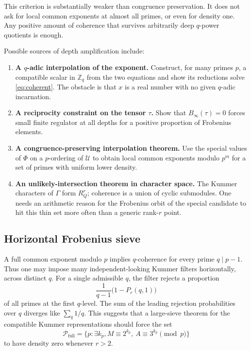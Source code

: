 \documentclass[11pt]{article}
\theoremstyle{definition}
\theoremstyle{remark}
\newcommand{\Z}{\mathbb{Z}}
\begin{document}
This criterion is substantially weaker than congruence preservation.  It does not ask for local
common exponents at almost all primes, or even for density one.  Any positive amount of coherence
that survives arbitrarily deep $q$-power quotients is enough.

Possible sources of depth amplification include:
\begin{enumerate}[leftmargin=2.2em]
\item \textbf{A $q$-adic interpolation of the exponent.}  Construct, for many primes $p$, a
      compatible scalar in $\Z_q$ from the two equations and show its reductions solve
      \eqref{eq:coherent}.  The obstacle is that $x$ is a real number with no given $q$-adic
      incarnation.
\item \textbf{A reciprocity constraint on the tensor $\tau$.}  Show that
      $B_\infty(\tau)=0$ forces small finite regulator at all depths for a positive proportion
      of Frobenius elements.
\item \textbf{A congruence-preserving interpolation theorem.}  Use the special values of $\Phi$
      on a $p$-ordering of $\mathcal U$ to obtain local common exponents modulo $p^m$ for a
      set of primes with uniform lower density.
\item \textbf{An unlikely-intersection theorem in character space.}  The Kummer characters of
      $\Gamma$ form $R_Q^r$; coherence is a union of cyclic submodules.  One needs an
      arithmetic reason for the Frobenius orbit of the special candidate to hit this thin set
      more often than a generic rank-$r$ point.
\end{enumerate}

\subsection{Horizontal Frobenius sieve}

A full common exponent modulo $p$ implies $q$-coherence for every prime $q\mid p-1$.  Thus one
may impose many independent-looking Kummer filters horizontally, across distinct $q$.  For a
single admissible $q$, the filter rejects a proportion
\[
       \frac1{q-1}\bigl(1-P_r(q,1)\bigr)
\]
of all primes at the first $q$-level.  The sum of the leading rejection probabilities over $q$
diverges like $\sum_q1/q$.  This suggests that a large-sieve theorem for the compatible Kummer
representations should force the set
\[
 \mathcal P_{\mathrm{full}}
 =\{p:\exists k_p,
       M\equiv2^{k_p},\ A\equiv3^{k_p}\pmod p\}
 \tag{10.5}\label{eq:Pfull}
\]
to have density zero whenever $r>2$.
\end{document}
